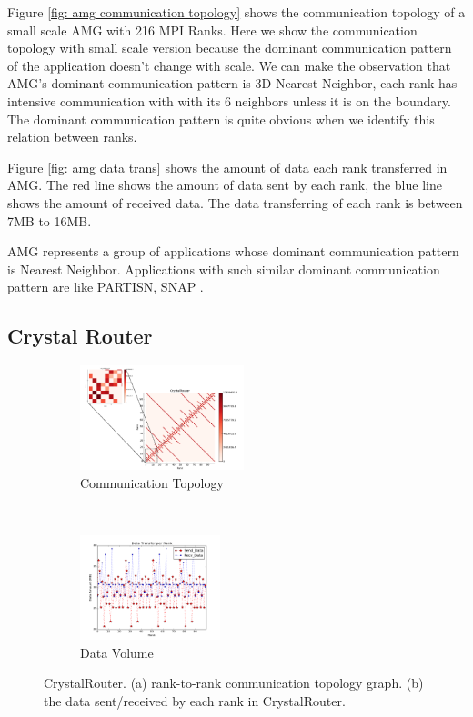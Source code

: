 \documentclass[conference]{IEEEtran}
\begin{document}
Figure \ref{fig: amg communication topology} shows the communication topology of a small scale AMG with 216 MPI Ranks. Here we show the communication topology with small scale version because the dominant communication pattern of the application doesn't change with scale. We can make the observation that AMG's dominant communication pattern is 3D Nearest Neighbor, each rank has intensive communication with with its 6 neighbors unless it is on the boundary. The dominant communication pattern is quite obvious when we identify this relation between ranks.

Figure \ref{fig: amg data trans} shows the amount of data each rank transferred in AMG. The red line shows the amount of data sent by each rank, the blue line shows the amount of received data. The data transferring of each rank is between 7MB to 16MB.

AMG represents a group of applications whose dominant communication pattern is Nearest Neighbor. Applications with such similar dominant communication pattern are like PARTISN, SNAP \cite{design forward webpage}.


\subsection{Crystal Router}
\label{sec:crystalrouter}

\begin{figure}[t!]
    \centering
    \begin{subfigure}[t]{0.22\textwidth}
        \centering
        \includegraphics[height=1.2in]{figs/appstudy/cr/cr_pip}
        \caption{Communication Topology}
        \label{fig: cr communication topology}
    \end{subfigure}
    ~
    \begin{subfigure}[t]{0.22\textwidth}
        \centering
        \includegraphics[height=1.2in]{figs/appstudy/cr/cr_data_transfer}
        \caption{Data Volume}
        \label{fig: cr data trans}
    \end{subfigure}
    \caption{CrystalRouter. (a) rank-to-rank communication topology graph. (b) the data sent/received by each rank in CrystalRouter. }
\end{figure}
\end{document}
